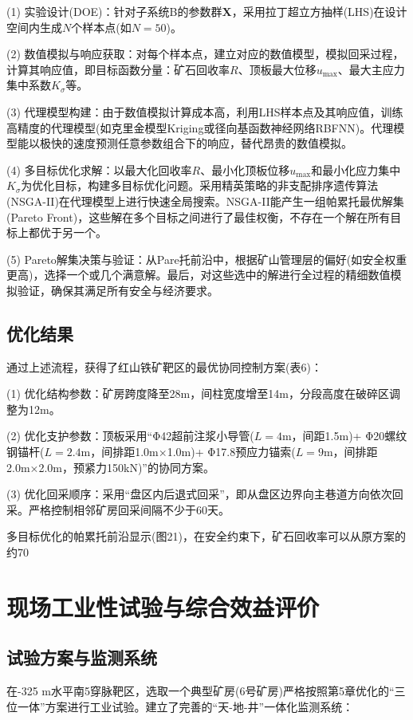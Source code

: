 \documentclass[twocolumn,a4paper,10pt]{article}
\begin{document}
(1) 实验设计(DOE)：针对子系统B的参数群$\mathbf{X}$，采用拉丁超立方抽样(LHS)在设计空间内生成$N$个样本点(如$N=50$)。

(2) 数值模拟与响应获取：对每个样本点，建立对应的数值模型，模拟回采过程，计算其响应值，即目标函数分量：矿石回收率$R$、顶板最大位移$u_{\text{max}}$、最大主应力集中系数$K_{\sigma}$等。

(3) 代理模型构建：由于数值模拟计算成本高，利用LHS样本点及其响应值，训练高精度的代理模型(如克里金模型Kriging或径向基函数神经网络RBFNN)。代理模型能以极快的速度预测任意参数组合下的响应，替代昂贵的数值模拟。

(4) 多目标优化求解：以最大化回收率$R$、最小化顶板位移$u_{\text{max}}$和最小化应力集中$K_{\sigma}$为优化目标，构建多目标优化问题。采用精英策略的非支配排序遗传算法(NSGA-II)在代理模型上进行快速全局搜索。NSGA-II能产生一组帕累托最优解集(Pareto Front)，这些解在多个目标之间进行了最佳权衡，不存在一个解在所有目标上都优于另一个。

(5) Pareto解集决策与验证：从Pare托前沿中，根据矿山管理层的偏好(如安全权重更高)，选择一个或几个满意解。最后，对这些选中的解进行全过程的精细数值模拟验证，确保其满足所有安全与经济要求。

\subsection{优化结果}
通过上述流程，获得了红山铁矿靶区的最优协同控制方案(表6)：

(1) 优化结构参数：矿房跨度降至28m，间柱宽度增至14m，分段高度在破碎区调整为12m。

(2) 优化支护参数：顶板采用“Φ42超前注浆小导管($L=4$m，间距1.5m)+ Φ20螺纹钢锚杆($L=2.4$m，间排距1.0m×1.0m)+ Φ17.8预应力锚索($L=9$m，间排距2.0m×2.0m，预紧力150kN)”的协同方案。

(3) 优化回采顺序：采用“盘区内后退式回采”，即从盘区边界向主巷道方向依次回采。严格控制相邻矿房回采间隔不少于60天。

多目标优化的帕累托前沿显示(图21)，在安全约束下，矿石回收率可以从原方案的约70%

\section{现场工业性试验与综合效益评价}
\subsection{试验方案与监测系统}
在-325 m水平南5穿脉靶区，选取一个典型矿房(6号矿房)严格按照第5章优化的“三位一体”方案进行工业试验。建立了完善的“天-地-井”一体化监测系统：
\end{document}

